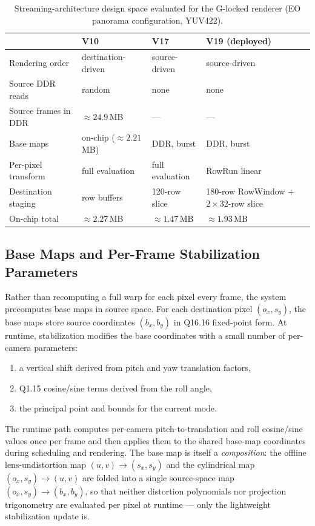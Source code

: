 \documentclass[journal]{IEEEtran}
\begin{document}
\begin{table}[t]
\caption{Streaming-architecture design space evaluated for the G-locked renderer (EO panorama configuration, YUV422).}
\label{tab:arch}
\centering
\footnotesize
\begin{tabularx}{\columnwidth}{@{}lYYY@{}}
\toprule
 & V10 & V17 & V19 (deployed) \\
\midrule
Rendering order & destination-driven & source-driven & source-driven \\
Source DDR reads & random & none & none \\
Source frames in DDR & ${\approx}24.9$\,MB & --- & --- \\
Base maps & on-chip (${\approx}2.21$\,MB) & DDR, burst & DDR, burst \\
Per-pixel transform & full evaluation & full evaluation & RowRun linear \\
Destination staging & row buffers & 120-row slice & 180-row RowWindow $+$ $2{\times}32$-row slice \\
On-chip total & ${\approx}2.27$\,MB & ${\approx}1.47$\,MB & ${\approx}1.93$\,MB \\
\bottomrule
\end{tabularx}
\end{table}

\subsection{Base Maps and Per-Frame Stabilization Parameters}
Rather than recomputing a full warp for each pixel every frame, the system precomputes base maps in source space. For each destination pixel $(o_x,s_y)$, the base maps store source coordinates $(b_x,b_y)$ in Q16.16 fixed-point form. At runtime, stabilization modifies the base coordinates with a small number of per-camera parameters:
\begin{enumerate}[leftmargin=*,itemsep=0pt,topsep=2pt]
  \item a vertical shift derived from pitch and yaw translation factors,
  \item Q1.15 cosine/sine terms derived from the roll angle,
  \item the principal point and bounds for the current mode.
\end{enumerate}
The runtime path computes per-camera pitch-to-translation and roll cosine/sine values once per frame and then applies them to the shared base-map coordinates during scheduling and rendering. The base map is itself a \emph{composition}: the offline lens-undistortion map $(u,v)\!\to\!(s_x,s_y)$ and the cylindrical map $(o_x,s_y)\!\to\!(u,v)$ are folded into a single source-space map $(o_x,s_y)\!\to\!(b_x,b_y)$, so that neither distortion polynomials nor projection trigonometry are evaluated per pixel at runtime --- only the lightweight stabilization update is.
\end{document}
